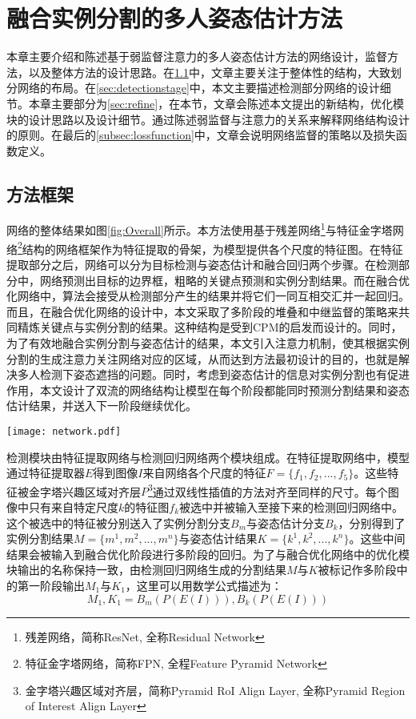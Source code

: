 \chapter{融合实例分割的多人姿态估计方法}
\label{cha:method}
本章主要介绍和陈述基于弱监督注意力的多人姿态估计方法的网络设计，监督方法，以及整体方法的设计思路。在\ref{sec:methodoverview}中，文章主要关注于整体性的结构，大致划分网络的布局。在\ref{sec:detectionstage}中，本文主要描述检测部分网络的设计细节。本章主要部分为\ref{sec:refine}，在本节，文章会陈述本文提出的新结构，优化模块的设计思路以及设计细节。通过陈述弱监督与注意力的关系来解释网络结构设计的原则。在最后的\ref{subsec:lossfunction}中，文章会说明网络监督的策略以及损失函数定义。

\section{方法框架}
\label{sec:methodoverview}
网络的整体结果如图\ref{fig:Overall}所示。本方法使用基于残差网络\footnote{残差网络，简称ResNet, 全称Residual Network}与特征金字塔网络\footnote{特征金字塔网络，简称FPN, 全程Feature Pyramid Network}结构的网络框架作为特征提取的骨架，为模型提供各个尺度的特征图。在特征提取部分之后，网络可以分为目标检测与姿态估计和融合回归两个步骤。在检测部分中，网络预测出目标的边界框，粗略的关键点预测和实例分割结果。而在融合优化网络中，算法会接受从检测部分产生的结果并将它们一同互相交汇并一起回归。而且，在融合优化网络的设计中，本文采取了多阶段的堆叠和中继监督的策略来共同精炼关键点与实例分割的结果。这种结构是受到CPM\cite{wei2016convolutional}的启发而设计的。同时，为了有效地融合实例分割与姿态估计的结果，本文引入注意力机制，使其根据实例分割的生成注意力关注网络对应的区域，从而达到方法最初设计的目的，也就是解决多人检测下姿态遮挡的问题。同时，考虑到姿态估计的信息对实例分割也有促进作用，本文设计了双流的网络结构让模型在每个阶段都能同时预测分割结果和姿态估计结果，并送入下一阶段继续优化。

\begin{figure*}[htbp]	
	\centering
	\texttt{[image: network.pdf]}
	\caption{网络整体结构}
	\label{fig:Overall}
\end{figure*}

检测模块由特征提取网络与检测回归网络两个模块组成。在特征提取网络中，模型通过特征提取器$E$得到图像$I$来自网络各个尺度的特征$F=\{f_1, f_2, ..., f_5\}$。这些特征被金字塔兴趣区域对齐层$P$\footnote{金字塔兴趣区域对齐层，简称Pyramid RoI Align Layer, 全称Pyramid Region of Interest Align Layer}通过双线性插值的方法对齐至同样的尺寸。每个图像中只有来自特定尺度$k$的特征图$f_k$被选中并被输入至接下来的检测回归网络中。这个被选中的特征被分别送入了实例分割分支$B_m$与姿态估计分支$B_k$，分别得到了实例分割结果$M=\{m^1, m^2, ..., m^n\}$与姿态估计结果$K=\{k^1, k^2, ..., k^n\}$。这些中间结果会被输入到融合优化阶段进行多阶段的回归。为了与融合优化网络中的优化模块输出的名称保持一致，由检测回归网络生成的分割结果$M$与$K$被标记作多阶段中的第一阶段输出$M_1$与$K_1$，这里可以用数学公式描述为：
\begin{equation}
\label{def:detectnet}
M_1, K_1 = B_m(P(E(I))), B_k(P(E(I)))
\end{equation}

